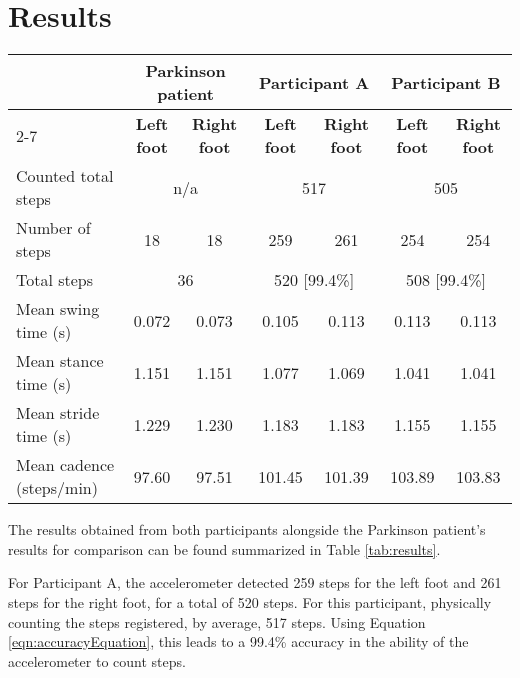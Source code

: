 
\section{Results}

\begin{table*}
	\centering
	\begin{tabular}{l |cc|cc|cc|}
		\hline
		& \multicolumn{2}{c|}{Parkinson patient} & \multicolumn{2}{c|}{Participant A} & \multicolumn{2}{c|}{Participant B} \\
		\cmidrule(r){2-7}
		& \multicolumn{1}{c}{\textbf{Left foot}} & \multicolumn{1}{c|}{\textbf{Right foot}} & \multicolumn{1}{c}{\textbf{Left foot}} & \multicolumn{1}{c|}{\textbf{Right foot}} & \multicolumn{1}{c}{\textbf{Left foot}} & \multicolumn{1}{c|}{\textbf{Right foot}} \\
		\hline
		Counted total steps & \multicolumn{2}{c|}{n/a} & \multicolumn{2}{c|}{517} & \multicolumn{2}{c|}{505} \\
		Number of steps & 18 & 18 & 259 & 261& 254 & 254\\
		Total steps & \multicolumn{2}{c|}{36} & \multicolumn{2}{c|}{520 [99.4\%]} & \multicolumn{2}{c|}{508 [99.4\%]} \\
		Mean swing time (s) & 0.072 & 0.073 & 0.105 & 0.113 & 0.113 & 0.113 \\
		Mean stance time (s) & 1.151 & 1.151 & 1.077 & 1.069 & 1.041 & 1.041 \\
		Mean stride time (s) & 1.229 & 1.230 & 1.183 & 1.183 & 1.155 & 1.155 \\
		Mean cadence (steps/min) & 97.60 & 97.51 & 101.45 & 101.39 & 103.89 & 103.83\\
		\hline
	\end{tabular}
	\caption{Summary of the number of steps and additionally calculated gait parameters.}
	\label{tab:results}
\end{table*}
The results obtained from both participants alongside the Parkinson patient's results for comparison can be found summarized in Table \ref{tab:results}.

For Participant A, the accelerometer detected 259 steps for the left foot and 261 steps for the right foot, for a total of 520 steps. For this participant, physically counting the steps registered, by average, 517 steps. Using Equation \eqref{eqn:accuracyEquation}, this leads to a 99.4\% accuracy in the ability of the accelerometer to count steps.

